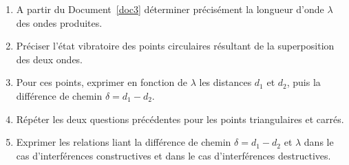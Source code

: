 \documentclass[a4paper,11pt,fleqn]{article}%
\begin{document}
\begin{question}
  \begin{enumerate}
        \item A partir du Document~\ref{doc3} déterminer précisément la longueur d'onde $\lambda$ des ondes produites.
        \item Préciser l'état vibratoire des points circulaires résultant de la superposition des deux ondes.
        \item Pour ces points, exprimer en fonction de $\lambda$ les distances $d_1$ et $d_2$, puis la différence de chemin $\delta = d_1 - d_2$.
        \item Répéter les deux questions précédentes pour les points triangulaires et carrés.
        \item Exprimer les relations liant la différence de chemin $\delta = d_1 - d_2$ et $\lambda$ dans le cas d'interférences constructives et dans le cas d'interférences destructives.
      \end{enumerate}
\end{question}

\newpage
\end{document}
